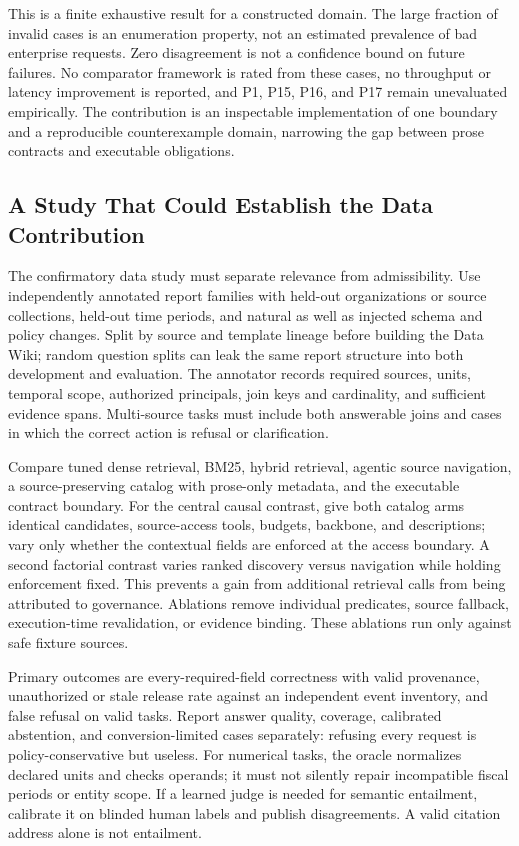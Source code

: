 \documentclass[11pt]{article}
\begin{document}
This is a finite exhaustive result for a constructed domain. The large fraction of invalid cases is an enumeration property, not an estimated prevalence of bad enterprise requests. Zero disagreement is not a confidence bound on future failures. No comparator framework is rated from these cases, no throughput or latency improvement is reported, and P1, P15, P16, and P17 remain unevaluated empirically. The contribution is an inspectable implementation of one boundary and a reproducible counterexample domain, narrowing the gap between prose contracts and executable obligations.

\subsection{A Study That Could Establish the Data Contribution}
\label{sec:data-study}

The confirmatory data study must separate relevance from admissibility. Use independently annotated report families with held-out organizations or source collections, held-out time periods, and natural as well as injected schema and policy changes. Split by source and template lineage before building the Data Wiki; random question splits can leak the same report structure into both development and evaluation. The annotator records required sources, units, temporal scope, authorized principals, join keys and cardinality, and sufficient evidence spans. Multi-source tasks must include both answerable joins and cases in which the correct action is refusal or clarification.

Compare tuned dense retrieval, BM25, hybrid retrieval, agentic source navigation, a source-preserving catalog with prose-only metadata, and the executable contract boundary. For the central causal contrast, give both catalog arms identical candidates, source-access tools, budgets, backbone, and descriptions; vary only whether the contextual fields are enforced at the access boundary. A second factorial contrast varies ranked discovery versus navigation while holding enforcement fixed. This prevents a gain from additional retrieval calls from being attributed to governance. Ablations remove individual predicates, source fallback, execution-time revalidation, or evidence binding. These ablations run only against safe fixture sources.

Primary outcomes are every-required-field correctness with valid provenance, unauthorized or stale release rate against an independent event inventory, and false refusal on valid tasks. Report answer quality, coverage, calibrated abstention, and conversion-limited cases separately: refusing every request is policy-conservative but useless. For numerical tasks, the oracle normalizes declared units and checks operands; it must not silently repair incompatible fiscal periods or entity scope. If a learned judge is needed for semantic entailment, calibrate it on blinded human labels and publish disagreements. A valid citation address alone is not entailment.
\end{document}
